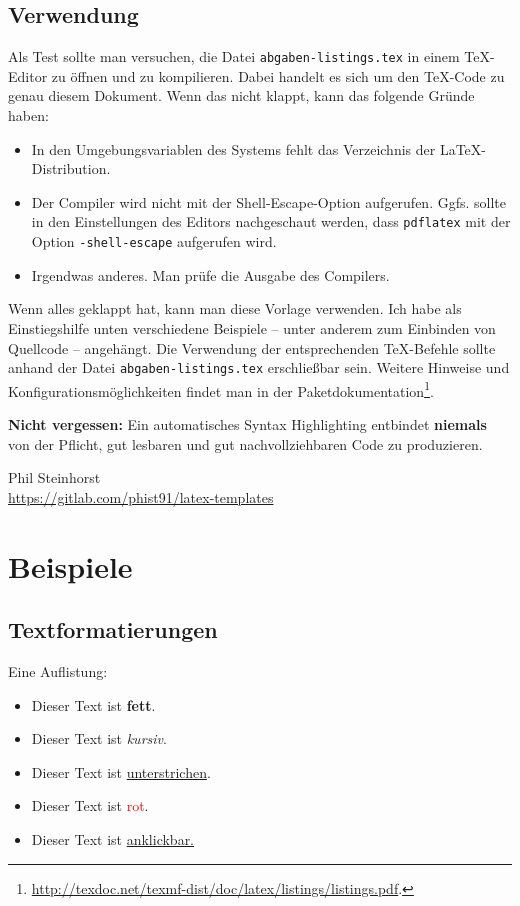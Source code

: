 \subsection*{Verwendung}
Als Test sollte man versuchen, die Datei \texttt{abgaben-listings.tex} in einem TeX-Editor zu öffnen und zu kompilieren.
Dabei handelt es sich um den TeX-Code zu genau diesem Dokument.
Wenn das nicht klappt, kann das folgende Gründe haben:
\begin{itemize}
  \item In den Umgebungsvariablen des Systems fehlt das Verzeichnis der \LaTeX-Distribution.
  \item Der Compiler wird nicht mit der Shell-Escape-Option aufgerufen.
  Ggfs. sollte in den Einstellungen des Editors nachgeschaut werden, dass \texttt{pdflatex} mit der Option \texttt{-shell-escape} aufgerufen wird.
  \item Irgendwas anderes. Man prüfe die Ausgabe des Compilers.
\end{itemize}
Wenn alles geklappt hat, kann man diese Vorlage verwenden.
Ich habe als Einstiegshilfe unten verschiedene Beispiele -- unter anderem zum Einbinden von Quellcode -- angehängt.
Die Verwendung der entsprechenden TeX-Befehle sollte anhand der Datei \texttt{abgaben-listings.tex} erschließbar sein.
Weitere Hinweise und Konfigurationsmöglichkeiten findet man in der Paketdokumentation\footnote{\url{http://texdoc.net/texmf-dist/doc/latex/listings/listings.pdf}.}.

\textbf{Nicht vergessen:} Ein automatisches Syntax Highlighting entbindet \textbf{niemals} von der Pflicht, gut lesbaren und gut nachvollziehbaren Code zu produzieren.

\begin{flushright}
  Phil Steinhorst \\
  \url{https://gitlab.com/phist91/latex-templates}
\end{flushright}

\newpage

\section*{Beispiele}
\subsection*{Textformatierungen}
Eine Auflistung:
\begin{itemize}
  \item Dieser Text ist \textbf{fett}.
  \item Dieser Text ist \textit{kursiv}.
  \item Dieser Text ist \underline{unterstrichen}.
  \item Dieser Text ist \textcolor{red}{rot}.
  \item Dieser Text ist \href{https://gitlab.com/phist91/latex-templates}{anklickbar.}
\end{itemize}

